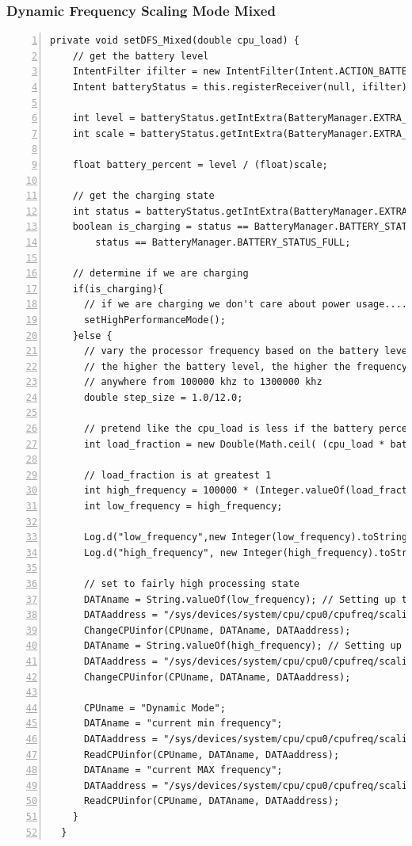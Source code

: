 \documentclass{article} %
\begin{document}
\subsubsection{Dynamic Frequency Scaling Mode Mixed}
\begin{lstlisting}[float=*,caption={Dynamic Frequency Scaling Mode Mixed},label={lst:DFS_mixed},numbers=left]
  private void setDFS_Mixed(double cpu_load) {
    // get the battery level
    IntentFilter ifilter = new IntentFilter(Intent.ACTION_BATTERY_CHANGED);
    Intent batteryStatus = this.registerReceiver(null, ifilter);

    int level = batteryStatus.getIntExtra(BatteryManager.EXTRA_LEVEL, -1);
    int scale = batteryStatus.getIntExtra(BatteryManager.EXTRA_SCALE, -1);

    float battery_percent = level / (float)scale;

    // get the charging state
    int status = batteryStatus.getIntExtra(BatteryManager.EXTRA_STATUS, -1);
    boolean is_charging = status == BatteryManager.BATTERY_STATUS_CHARGING ||
        status == BatteryManager.BATTERY_STATUS_FULL;

    // determine if we are charging
    if(is_charging){
      // if we are charging we don't care about power usage.... set to high performance mode
      setHighPerformanceMode();
    }else {
      // vary the processor frequency based on the battery level.
      // the higher the battery level, the higher the frequency.
      // anywhere from 100000 khz to 1300000 khz
      double step_size = 1.0/12.0;

      // pretend like the cpu_load is less if the battery percent is lower
      int load_fraction = new Double(Math.ceil( (cpu_load * battery_percent) / step_size)).intValue();

      // load_fraction is at greatest 1
      int high_frequency = 100000 * (Integer.valueOf(load_fraction) + 1);
      int low_frequency = high_frequency;

      Log.d("low_frequency",new Integer(low_frequency).toString());
      Log.d("high_frequency", new Integer(high_frequency).toString());

      // set to fairly high processing state
      DATAname = String.valueOf(low_frequency); // Setting up the minimum frequency at low frequency
      DATAaddress = "/sys/devices/system/cpu/cpu0/cpufreq/scaling_min_freq";
      ChangeCPUinfor(CPUname, DATAname, DATAaddress);
      DATAname = String.valueOf(high_frequency); // Setting up the maximum frequency at high frequency
      DATAaddress = "/sys/devices/system/cpu/cpu0/cpufreq/scaling_max_freq";
      ChangeCPUinfor(CPUname, DATAname, DATAaddress);

      CPUname = "Dynamic Mode";
      DATAname = "current min frequency";
      DATAaddress = "/sys/devices/system/cpu/cpu0/cpufreq/scaling_min_freq";
      ReadCPUinfor(CPUname, DATAname, DATAaddress);
      DATAname = "current MAX frequency";
      DATAaddress = "/sys/devices/system/cpu/cpu0/cpufreq/scaling_max_freq";
      ReadCPUinfor(CPUname, DATAname, DATAaddress);
    }
  }
\end{lstlisting}
\end{document}
